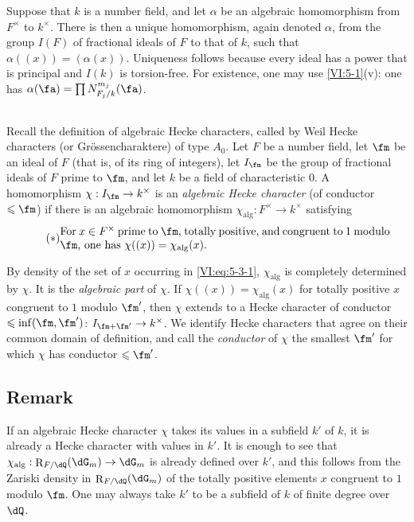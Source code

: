 \documentclass[12pt,oneside,english]{smfbook}
\DeclareMathOperator{\res}{R} %
\newcounter{char}
\begin{document}
Suppose that $k$ is a number field, and let $\alpha$ be an algebraic homomorphism from $F^\times$ to $k^\times$. There is then a unique homomorphism, again denoted $\alpha$, from the group $I(F)$ of fractional ideals of $F$ to that of $k$, such that $\alpha((x))=(\alpha(x))$. Uniqueness follows because every ideal has a power that is principal and $I(k)$ is torsion-free. For existence, one may use \ref{VI:5-1}(v): one has $\alpha(\fa)=\prod N_{F_j/k}^{m_j}(\fa)$.

\subsection{}\label{VI:5-3}

Recall the definition of algebraic Hecke characters, called by Weil Hecke characters (or Grössencharaktere) of type $A_0$. Let $F$ be a number field, let $\fm$ be an ideal of $F$ (that is, of its ring of integers), let $I_\fm$ be the group of fractional ideals of $F$ prime to $\fm$, and let $k$ be a field of characteristic $0$. A homomorphism $\chi:I_\fm\to k^\times$ is an \emph{algebraic Hecke character} (of conductor $\leqslant\fm$) if there is an algebraic homomorphism $\chi_{\mathrm{alg}}:F^\times\to k^\times$ satisfying
\begin{equation*}\tag{$*$}\label{VI:eq:5-3-1}
\parbox{0.86\textwidth}{For $x\in F^\times$ prime to $\fm$, totally
positive, and congruent to $1$ modulo $\fm$, one has
$\chi((x))=\chi_{\mathrm{alg}}(x)$.}
\end{equation*}

By density of the set of $x$ occurring in \eqref{VI:eq:5-3-1}, $\chi_{\mathrm{alg}}$ is completely determined by $\chi$. It is the \emph{algebraic part} of $\chi$. If $\chi((x))=\chi_{\mathrm{alg}}(x)$ for totally positive $x$ congruent to $1$ modulo $\fm'$, then $\chi$ extends to a Hecke character of conductor $\leqslant\inf(\fm,\fm')$: $I_{\fm+\fm'}\to k^\times$. We identify Hecke characters that agree on their common domain of definition, and call the \emph{conductor} of $\chi$ the smallest $\fm'$ for which $\chi$ has conductor $\leqslant\fm'$.

\subsection{Remark}\label{VI:5-4}

If an algebraic Hecke character $\chi$ takes its values in a subfield $k'$ of $k$, it is already a Hecke character with values in $k'$. It is enough to see that $\chi_{\mathrm{alg}}:\res_{F/\dQ}(\dG_m)\to\dG_m$ is already defined over $k'$, and this follows from the Zariski density in $\res_{F/\dQ}(\dG_m)$ of the totally positive elements $x$ congruent to $1$ modulo $\fm$. One may always take $k'$ to be a subfield of $k$ of finite degree over $\dQ$.
\end{document}
